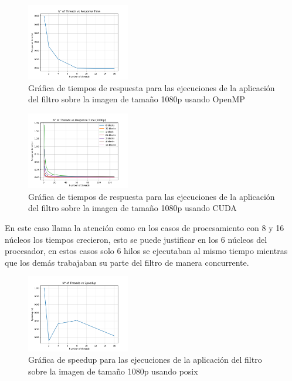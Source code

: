 \begin{figure}[H]
    \centering
    \includegraphics[width=0.4\textwidth]{../plots/omp_1080p_response_time.png}
    \caption{Gráfica de tiempos de respuesta para las ejecuciones de la aplicación del filtro sobre la imagen de tamaño 1080p usando OpenMP}
\end{figure}

\begin{figure}[H]
    \centering
    \includegraphics[width=0.4\textwidth]{../plots/cuda_1080p_response_time.png}
    \caption{Gráfica de tiempos de respuesta para las ejecuciones de la aplicación del filtro sobre la imagen de tamaño 1080p usando CUDA}
\end{figure}

En este caso llama la atención como en los casos de procesamiento con 8 y 16 núcleos los tiempos crecieron, esto se puede justificar en los 6 núcleos del procesador, en estos casos solo 6 hilos se ejecutaban al mismo tiempo mientras que los demás trabajaban su parte del filtro de manera concurrente.

\begin{figure}[H]
    \centering
    \includegraphics[width=0.4\textwidth]{../plots/1080p_speedup.png}
    \caption{Gráfica de speedup para las ejecuciones de la aplicación del filtro sobre la imagen de tamaño 1080p usando posix}
\end{figure}


